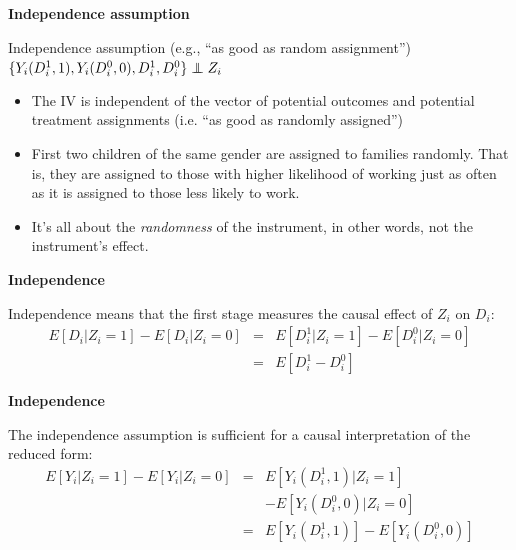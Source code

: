 \documentclass[notes=show]{beamer}
\newcommand\independent{\protect\mathpalette{\protect\independenT}{\perp}}
\def\independenT#1#2{\mathrel{\rlap{$#1#2$}\mkern2mu{#1#2}}}
\begin{document}
\begin{frame}[plain]

	\begin{center}
	\textbf{Independence assumption}
	\end{center}
	
	\begin{block}{Independence assumption (e.g., ``as good as random assignment'')}
	$\{Y_i(D^1_i,1),Y_i(D^0_i,0),D^1_{i},D^{0}_i\} \independent{Z}_i$
	\end{block}

\begin{itemize}	
\item The IV is independent of the vector of potential outcomes and potential treatment assignments (i.e. ``as good as randomly assigned'') 
\item First two children of the same gender are assigned to families randomly. That is, they are assigned to those with higher likelihood of working just as often as it is assigned to those less likely to work.
\item It's all about the \emph{randomness} of the instrument, in other words, not the instrument's effect.
\end{itemize}

\end{frame}


\begin{frame}[plain]
\begin{center}
\textbf{Independence}
\end{center}

		 Independence means that the first stage measures the causal effect of $Z_i$ on $D_i$:
			\begin{eqnarray*}
			E[D_i|Z_i=1] - E[D_i|Z_i=0] &=& E[D^1_{i} | Z_i = 1] - E[D^0_{i}|Z_i = 0] \\
			&=& E[D^1_{i} - D^0_{i}]
			\end{eqnarray*}

\end{frame}

\begin{frame}[plain]
\begin{center}
\textbf{Independence}
\end{center}

	The  independence assumption is sufficient for a causal interpretation of the reduced form:
			\begin{eqnarray*}
			E[Y_i | Z_i=1] - E[Y_i | Z_i=0] &=& E[Y_i(D^1_{i},1)|Z_i = 1] \\
			&& - E[Y_i(D^0_{i},0) | Z_i = 0] \\
			&=&E[Y_i(D^1_{i},1)] - E[Y_i(D^0_{i},0)]
			\end{eqnarray*}
\end{frame}
\end{document}
